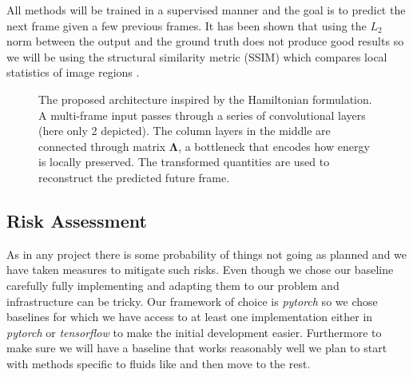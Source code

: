 \documentclass[a4paper,11pt]{article}
\begin{document}
All methods will be trained in a supervised manner and the goal is to predict the next frame given a few previous frames. It has been shown that using the $L_2$ norm between the output and the ground truth does not produce good results \cite{mathieu2015deep} so we will be using the structural similarity metric (SSIM) which compares local statistics of image regions \cite{wang2004imagessim}.


 \begin{figure}[tb]
\vskip 5mm
\begin{center}

\caption{The proposed architecture inspired by the Hamiltonian formulation. A multi-frame input passes through a series of convolutional layers (here only 2 depicted). The column layers in the middle are connected through matrix $\mathbf{\Lambda}$, a bottleneck that encodes how energy is locally preserved. The transformed quantities are used to reconstruct the predicted future frame.}
\label{fig:arch}
\end{center}
\vskip -5mm
\end{figure}

 \vskip -2mm
\subsection{Risk Assessment}
\label{sec:3risk}
\vskip -2mm
As in any project there is some probability of things not going as planned and we have taken measures to mitigate such risks. Even though we chose our baseline carefully fully implementing and adapting them to our problem and infrastructure can be tricky. Our framework of choice is \textit{pytorch} so we chose baselines for which we have access to at least one implementation either in \textit{pytorch} or \textit{tensorflow} to make the initial development easier. Furthermore to make sure we will have a baseline that works reasonably well we plan to start with methods specific to fluids like \cite{sorteberg2018approximating} and then move to the rest. 
\end{document}
